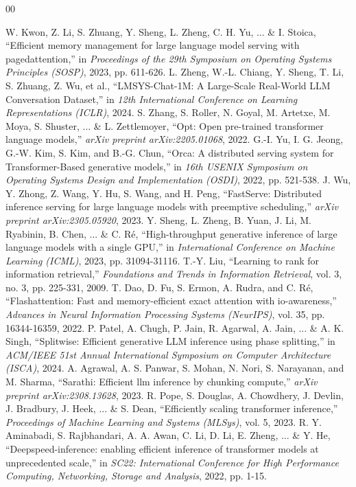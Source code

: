 \documentclass[conference]{IEEEtran}
\begin{document}

\begin{thebibliography}{00}

 W. Kwon, Z. Li, S. Zhuang, Y. Sheng, L. Zheng, C. H. Yu, ... \& I. Stoica, ``Efficient memory management for large language model serving with pagedattention,'' in \textit{Proceedings of the 29th Symposium on Operating Systems Principles (SOSP)}, 2023, pp. 611-626.
 L. Zheng, W.-L. Chiang, Y. Sheng, T. Li, S. Zhuang, Z. Wu, et al., ``LMSYS-Chat-1M: A Large-Scale Real-World LLM Conversation Dataset,'' in \textit{12th International Conference on Learning Representations (ICLR)}, 2024.
 S. Zhang, S. Roller, N. Goyal, M. Artetxe, M. Moya, S. Shuster, ... \& L. Zettlemoyer, ``Opt: Open pre-trained transformer language models,'' \textit{arXiv preprint arXiv:2205.01068}, 2022.
 G.-I. Yu, I. G. Jeong, G.-W. Kim, S. Kim, and B.-G. Chun, ``Orca: A distributed serving system for Transformer-Based generative models,'' in \textit{16th USENIX Symposium on Operating Systems Design and Implementation (OSDI)}, 2022, pp. 521-538.
 J. Wu, Y. Zhong, Z. Wang, Y. Hu, S. Wang, and H. Peng, ``FastServe: Distributed inference serving for large language models with preemptive scheduling,'' \textit{arXiv preprint arXiv:2305.05920}, 2023.
 Y. Sheng, L. Zheng, B. Yuan, J. Li, M. Ryabinin, B. Chen, ... \& C. Ré, ``High-throughput generative inference of large language models with a single GPU,'' in \textit{International Conference on Machine Learning (ICML)}, 2023, pp. 31094-31116.
 T.-Y. Liu, ``Learning to rank for information retrieval,'' \textit{Foundations and Trends in Information Retrieval}, vol. 3, no. 3, pp. 225-331, 2009.
 T. Dao, D. Fu, S. Ermon, A. Rudra, and C. Ré, ``Flashattention: Fast and memory-efficient exact attention with io-awareness,'' \textit{Advances in Neural Information Processing Systems (NeurIPS)}, vol. 35, pp. 16344-16359, 2022.
 P. Patel, A. Chugh, P. Jain, R. Agarwal, A. Jain, ... \& A. K. Singh, ``Splitwise: Efficient generative LLM inference using phase splitting,'' in \textit{ACM/IEEE 51st Annual International Symposium on Computer Architecture (ISCA)}, 2024.
 A. Agrawal, A. S. Panwar, S. Mohan, N. Nori, S. Narayanan, and M. Sharma, ``Sarathi: Efficient llm inference by chunking compute,'' \textit{arXiv preprint arXiv:2308.13628}, 2023.
 R. Pope, S. Douglas, A. Chowdhery, J. Devlin, J. Bradbury, J. Heek, ... \& S. Dean, ``Efficiently scaling transformer inference,'' \textit{Proceedings of Machine Learning and Systems (MLSys)}, vol. 5, 2023.
 R. Y. Aminabadi, S. Rajbhandari, A. A. Awan, C. Li, D. Li, E. Zheng, ... \& Y. He, ``Deepspeed-inference: enabling efficient inference of transformer models at unprecedented scale,'' in \textit{SC22: International Conference for High Performance Computing, Networking, Storage and Analysis}, 2022, pp. 1-15.


\end{thebibliography}
\end{document}
